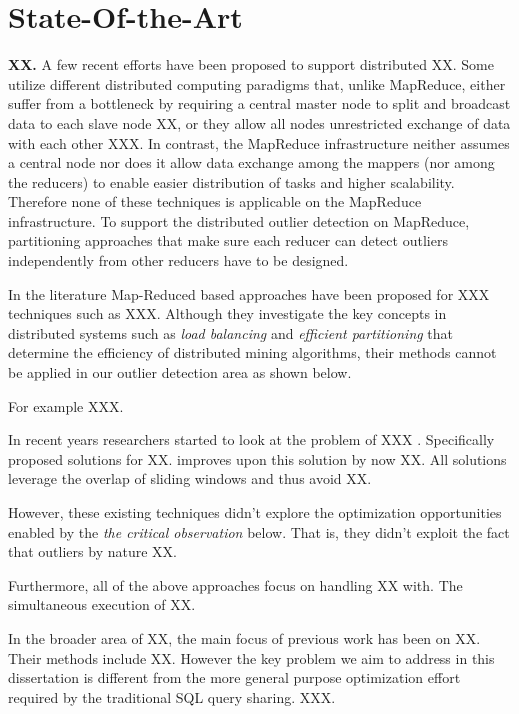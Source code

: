\section{State-Of-the-Art}
\label{sec:state-of-the-art}




\textbf{XX.} A few recent efforts have been proposed to support distributed XX. Some utilize different distributed computing paradigms that, unlike MapReduce, either suffer from a bottleneck by requiring a central master node to split and broadcast data to each slave node XX, or they allow all nodes unrestricted exchange of data with each other XXX. In contrast, the MapReduce infrastructure neither assumes a central node nor does it allow data exchange among the mappers (nor among the reducers) to enable easier distribution of tasks and higher scalability. Therefore none of these techniques is applicable on the MapReduce infrastructure. To support the distributed outlier detection on MapReduce, partitioning approaches that make sure each reducer can detect outliers independently from other reducers have to be designed.

In the literature Map-Reduced based approaches have been proposed for XXX techniques such as XXX. Although they investigate the key concepts in distributed systems such as \textit{load balancing} and \textit{efficient partitioning} that determine the efficiency of distributed mining algorithms, their methods cannot be applied in our outlier detection area as shown below.

For example XXX. 

\textbf{}
In recent years researchers started to look at the problem of XXX \cite{}. Specifically \cite{} proposed solutions for XX. \cite{} improves upon this solution \cite{} by now XX. All solutions leverage the overlap of sliding windows and thus avoid XX.


However, these existing techniques \cite{} didn't explore the optimization opportunities enabled by the \textit{the critical observation} below. That is, they didn't exploit the fact that outliers by nature XX. 

Furthermore, all of the above approaches focus on handling XX with. The simultaneous execution of XX.

In the broader area of XX,  the main focus of previous work has been on XX.  Their methods include XX. However the key problem we aim to address in this dissertation is different from the more general purpose optimization effort required by the traditional SQL query sharing. XXX. 

